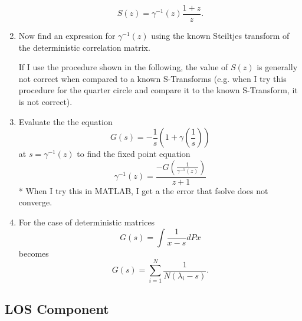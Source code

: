 \documentclass[12pt,a4paper]{report}
\begin{document}
\begin{enumerate}
		\begin{equation}
		 S(z) = \gamma^{-1}(z)\frac{1+z}{z}.
		\end{equation}
	\item
		Now find an expression for $\gamma^{-1}(z)$ using the known Steiltjes transform of the deterministic
		 correlation matrix. 
		 \par
		 If I use the procedure shown in the following, the value of $S(z)$ is 
		generally not correct when compared to a known S-Transforms (e.g. when I try this procedure for the 
		quarter circle and compare it to the known S-Transform, it is not correct).
	\item
		Evaluate the the equation 
		\begin{equation}
		G(s)=  -\frac{1}{s} (1+\gamma\left(\frac{1}{s}\right))
		\end{equation}
		at $s = \gamma^{-1}(z)$ 
		to find the fixed point equation
		 \begin{equation}
		\gamma^{-1}(z) = \frac{-G(\frac{1}{\gamma^{-1}(z)})}{z+1}
		\end{equation}
		* When I try this in MATLAB, I get a the error that fsolve does not converge.
	\item 
		For the case of deterministic matrices 
		\begin{equation}
		G(s) = \int \frac{1}{x-s} dPx
		\end{equation}
		becomes 
		\begin{equation}
		G(s) = \sum_{i=1}^{N} \frac{1}{N (\lambda_i - s)}.
		\end{equation}	
	\end{enumerate}


\subsection{LOS Component}\label{ssection:los}
\end{document}
